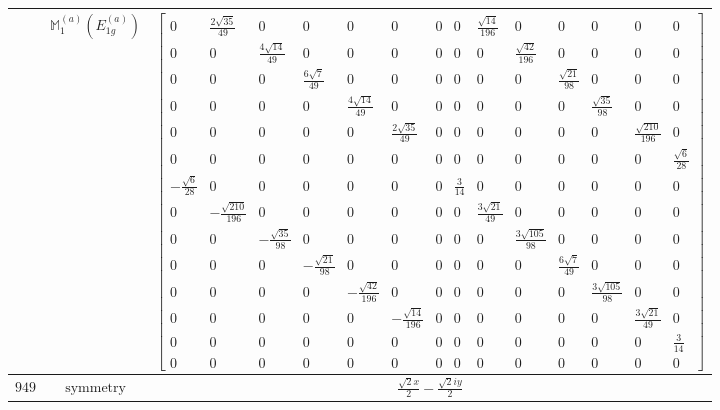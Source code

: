 \documentclass[fleqn,8pt,landscape]{jsarticle}
\begin{document}
\begin{longtable}{ccc}
$  $ & $ \mathbb{M}_{1}^{(a)}(E_{1g}^{(a)}) $ & $ \begin{bmatrix} 0 & \frac{2 \sqrt{35}}{49} & 0 & 0 & 0 & 0 & 0 & 0 & \frac{\sqrt{14}}{196} & 0 & 0 & 0 & 0 & 0 \\ 0 & 0 & \frac{4 \sqrt{14}}{49} & 0 & 0 & 0 & 0 & 0 & 0 & \frac{\sqrt{42}}{196} & 0 & 0 & 0 & 0 \\ 0 & 0 & 0 & \frac{6 \sqrt{7}}{49} & 0 & 0 & 0 & 0 & 0 & 0 & \frac{\sqrt{21}}{98} & 0 & 0 & 0 \\ 0 & 0 & 0 & 0 & \frac{4 \sqrt{14}}{49} & 0 & 0 & 0 & 0 & 0 & 0 & \frac{\sqrt{35}}{98} & 0 & 0 \\ 0 & 0 & 0 & 0 & 0 & \frac{2 \sqrt{35}}{49} & 0 & 0 & 0 & 0 & 0 & 0 & \frac{\sqrt{210}}{196} & 0 \\ 0 & 0 & 0 & 0 & 0 & 0 & 0 & 0 & 0 & 0 & 0 & 0 & 0 & \frac{\sqrt{6}}{28} \\ - \frac{\sqrt{6}}{28} & 0 & 0 & 0 & 0 & 0 & 0 & \frac{3}{14} & 0 & 0 & 0 & 0 & 0 & 0 \\ 0 & - \frac{\sqrt{210}}{196} & 0 & 0 & 0 & 0 & 0 & 0 & \frac{3 \sqrt{21}}{49} & 0 & 0 & 0 & 0 & 0 \\ 0 & 0 & - \frac{\sqrt{35}}{98} & 0 & 0 & 0 & 0 & 0 & 0 & \frac{3 \sqrt{105}}{98} & 0 & 0 & 0 & 0 \\ 0 & 0 & 0 & - \frac{\sqrt{21}}{98} & 0 & 0 & 0 & 0 & 0 & 0 & \frac{6 \sqrt{7}}{49} & 0 & 0 & 0 \\ 0 & 0 & 0 & 0 & - \frac{\sqrt{42}}{196} & 0 & 0 & 0 & 0 & 0 & 0 & \frac{3 \sqrt{105}}{98} & 0 & 0 \\ 0 & 0 & 0 & 0 & 0 & - \frac{\sqrt{14}}{196} & 0 & 0 & 0 & 0 & 0 & 0 & \frac{3 \sqrt{21}}{49} & 0 \\ 0 & 0 & 0 & 0 & 0 & 0 & 0 & 0 & 0 & 0 & 0 & 0 & 0 & \frac{3}{14} \\ 0 & 0 & 0 & 0 & 0 & 0 & 0 & 0 & 0 & 0 & 0 & 0 & 0 & 0 \end{bmatrix} $ \\ \hline
$ 949 $ & $ \text{symmetry} $ & $ \frac{\sqrt{2} x}{2} - \frac{\sqrt{2} i y}{2} $ \\

\end{longtable}
\end{document}
